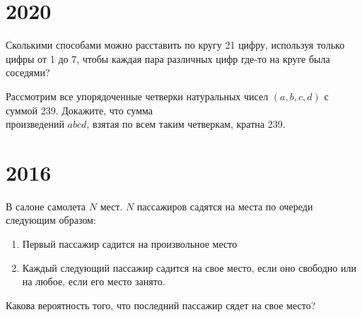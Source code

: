 \documentclass[11pt, a4paper]{template}
\begin{document}
\chapter{2020}

\begin{exercise}
Сколькими способами можно расставить по кругу 21 цифру, используя только цифры от 1 до 7, чтобы каждая пара различных цифр где-то на круге была соседями?
\end{exercise}

\begin{exercise}
Рассмотрим все упорядоченные четверки натуральных чисел $(a,b,c,d)$ с суммой 239. Докажите, что сумма \\ произведений $abcd$, взятая по всем таким четверкам, кратна 239.
\end{exercise}

\chapter{2016}

\begin{exercise}
В салоне самолета $N$ мест. $N$ пассажиров садятся на места по очереди следующим образом:
\begin{enumerate}
\item Первый пассажир садится на произвольное место
\item Каждый следующий пассажир садится на свое место, если оно свободно или на любое, если его место занято.
\end{enumerate}
Какова вероятность того, что последний пассажир сядет на свое место?
\end{exercise}
\end{document}
